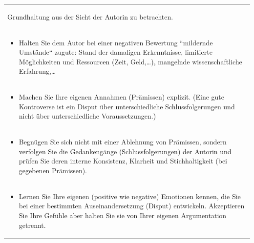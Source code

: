 \documentclass[]{book}
\providecommand{\tightlist}{%
  \setlength{\itemsep}{0pt}\setlength{\parskip}{0pt}}
\theoremstyle{definition}
\theoremstyle{definition}
\theoremstyle{definition}
\theoremstyle{remark}
\begin{document}
\begin{longtable}[]{@{}l@{}}
\begin{minipage}[t]{0.97\columnwidth}
\begin{itemize}
  Grundhaltung aus der Sicht der Autorin zu betrachten. \vspace{-6mm}
\end{itemize}\strut
\end{minipage}\tabularnewline
\begin{minipage}[t]{0.97\columnwidth}\raggedright\strut
\begin{itemize}
\tightlist
\item
  Halten Sie dem Autor bei einer negativen Bewertung ``mildernde
  Umstände`` zugute: Stand der damaligen Erkenntnisse, limitierte
  Möglichkeiten und Ressourcen (Zeit, Geld,\ldots{}), mangelnde
  wissenschaftliche Erfahrung,\ldots{} \vspace{-6mm}
\end{itemize}\strut
\end{minipage}\tabularnewline
\begin{minipage}[t]{0.97\columnwidth}\raggedright\strut
\begin{itemize}
\tightlist
\item
  Machen Sie Ihre eigenen Annahmen (Prämissen) explizit. (Eine gute
  Kontroverse ist ein Disput über unterschiedliche Schlussfolgerungen
  und nicht über unterschiedliche Voraussetzungen.) \vspace{-6mm}
\end{itemize}\strut
\end{minipage}\tabularnewline
\begin{minipage}[t]{0.97\columnwidth}\raggedright\strut
\begin{itemize}
\tightlist
\item
  Begnügen Sie sich nicht mit einer Ablehnung von Prämissen, sondern
  verfolgen Sie die Gedankengänge (Schlussfolgerungen) der Autorin und
  prüfen Sie deren interne Konsistenz, Klarheit und Stichhaltigkeit (bei
  gegebenen Prämissen). \vspace{-6mm}
\end{itemize}\strut
\end{minipage}\tabularnewline
\begin{minipage}[t]{0.97\columnwidth}\raggedright\strut
\begin{itemize}
\tightlist
\item
  Lernen Sie Ihre eigenen (positive wie negative) Emotionen kennen, die
  Sie bei einer bestimmten Auseinandersetzung (Disput) entwickeln.
  Akzeptieren Sie Ihre Gefühle aber halten Sie sie von Ihrer eigenen
  Argumentation getrennt.
\end{itemize}\strut
\end{minipage}\tabularnewline
\bottomrule
\end{longtable}
\end{document}
